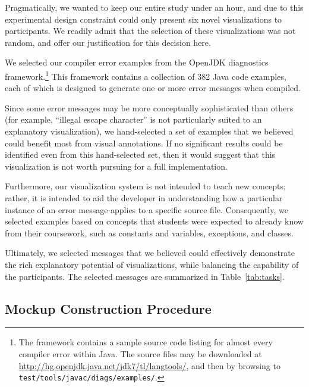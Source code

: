 \documentclass[conference]{IEEEtran}
\begin{document}
Pragmatically, we wanted to keep our entire study under an hour, and due to this experimental design constraint could only present six novel visualizations to participants. We readily admit that the selection of these visualizations was not random, and offer our justification for this decision here. 

We selected our compiler error examples from the OpenJDK diagnostics framework.\footnote{The framework contains a sample source code listing for almost every compiler error within Java. The source files may be downloaded at \url{http://hg.openjdk.java.net/jdk7/tl/langtools/}, and then by browsing to \texttt{test/tools/javac/diags/examples/}.} This framework contains a collection of 382 Java code examples, each of which is designed to generate one or more error messages when compiled.

Since some error messages may be more conceptually sophisticated than others (for example, ``illegal escape character'' is not particularly suited to an explanatory visualization), we hand-selected a set of examples that we believed could benefit most from visual annotations. If no significant results could be identified even from this hand-selected set, then it would suggest that this visualization is not worth pursuing for a full implementation.

Furthermore, our visualization system is not intended to teach new concepts; rather, it is intended to aid the developer in understanding how a particular instance of an error message applies to a specific source file. Consequently, we selected examples based on concepts that students were expected to already know from their coursework, such as constants and variables, exceptions, and classes.


Ultimately, we selected messages that we believed could effectively demonstrate the rich explanatory potential of visualizations, while balancing the capability of the participants. The selected messages are summarized in Table~\ref{tab:tasks}.

\subsection{Mockup Construction Procedure}
\end{document}

